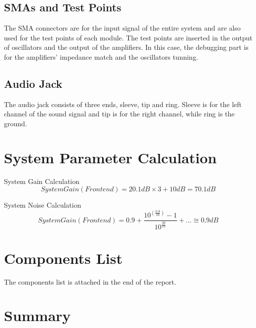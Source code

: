 \documentclass[]{article}
\begin{document}
    \subsection{SMAs and Test Points}
        The SMA connectors are for the input signal of the entire system and are
        also used for the test points of each module. The test points are
        inserted in the output of oscillators and the output of the amplifiers.
        In this case, the debugging part is for the amplifiers' impedance match
        and the oscillators tunning.
    \subsection{Audio Jack}
        The audio jack consists of three ends, sleeve, tip and ring. Sleeve is
        for the left channel of the sound signal and tip is for the right
        channel, while ring is the ground.

\section{System Parameter Calculation}
    System Gain Calculation
    \begin{equation}
        System Gain (Front end) = 20.1dB \times 3 + 10dB = 70.1dB
    \end{equation}

    System Noise Calculation
    \begin{equation}
        System Gain (Front end) = 0.9 +
        \frac{10^(\frac{0.9}{10})-1}{10^\frac{20}{10}} + ... \cong 0.9dB
    \end{equation}

\section{Components List}
    The components list is attached in the end of the report.

\section{Summary}
\end{document}
